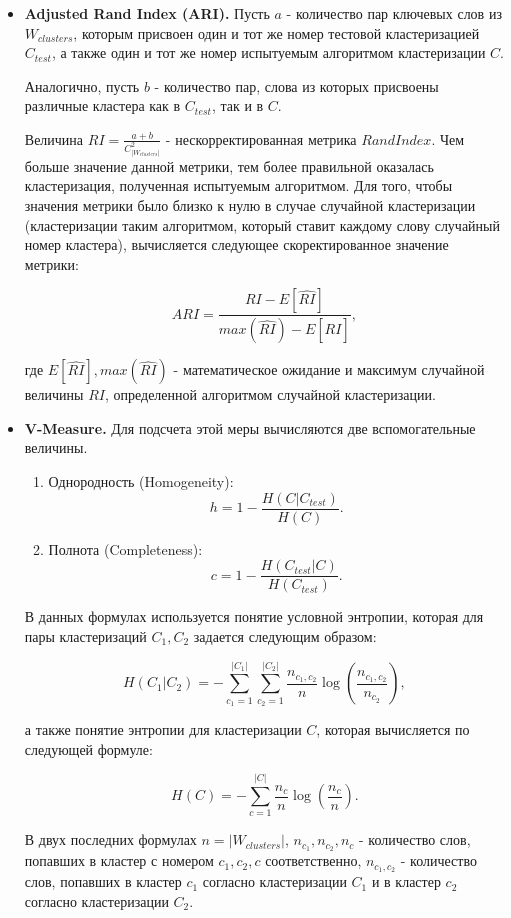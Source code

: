 \begin{itemize}
    \item \textbf{Adjusted Rand Index (ARI).} Пусть $a$ - количество пар ключевых слов из $W_{clusters}$, которым присвоен один и тот же номер тестовой кластеризацией $C_{test}$, а также один и тот же номер испытуемым алгоритмом кластеризации $C$. 
        
        Аналогично, пусть $b$ - количество пар, слова из которых присвоены различные кластера как в $C_{test}$, так и в $C$.  
        
        Величина $RI = \frac{a + b}{C_{|W_{clusters}|}^2}$ - нескорректированная метрика $Rand Index$. Чем больше значение данной метрики, тем более правильной оказалась кластеризация, полученная испытуемым алгоритмом. Для того, чтобы значения метрики было близко к нулю в случае случайной кластеризации (кластеризации таким алгоритмом, который ставит каждому слову случайный номер кластера), вычисляется следующее скоректированное значение метрики:

        $$ARI = \frac{RI - E[\hat{RI}]}{max(\hat{RI}) - E[\hat{RI}]},$$

        где $E[\hat{RI}], max(\hat{RI})$ - математическое ожидание и максимум случайной величины $RI$, определенной алгоритмом случайной кластеризации.

    \item \textbf{V-Measure.} Для подсчета этой меры вычисляются две вспомогательные величины. 
        \begin{enumerate}
            \item Однородность (Homogeneity):
                $$ h = 1 - \frac{H(C|C_{test})}{H(C)}. $$
            \item Полнота (Completeness):
                $$ c = 1 - \frac{H(C_{test}|C)}{H(C_{test})}. $$
        \end{enumerate}

        В данных формулах используется понятие условной энтропии, которая для пары кластеризаций $C_1, C_2$ задается следующим образом:
        
        $$ H(C_1|C_2) = -\sum_{c_1=1}^{|C_1|}\sum_{c_2=1}^{|C_2|}\frac{n_{c_1, c_2}}{n}\log\left(\frac{n_{c_1, c_2}}{n_{c_2}}\right),$$

        а также понятие энтропии для кластеризации $C$, которая вычисляется по следующей формуле:

        $$ H(C)  = -\sum_{c=1}^{|C|}\frac{n_c}{n}\log\left(\frac{n_c}{n}\right).$$

        В двух последних формулах $n = |W_{clusters}|$, $n_{c_1}, n_{c_2}, n_c$ - количество слов, попавших в кластер с номером $c_1, c_2, c$ соответственно, $n_{c_1, c_2}$ - количество слов, попавших в кластер $c_1$ согласно кластеризации $C_1$ и в кластер $c_2$ согласно кластеризации $C_2$.


\end{itemize}
